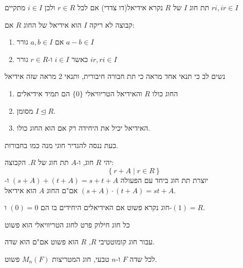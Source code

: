 \documentclass{tstextbook}
\begin{document}
\begin{definition}[אידיאל]
תת חוג \(I\) של \(R\) נקרא אידיאל(דו צדדי) אם לכל \(r\in R\) ולכן \(i \in I\) מתקיים \(ri,ir\in I\)

\end{definition}
\begin{proposition}
קבוצה לא ריקה \(I\) הוא אידיאל של החוג \(R\) אם:

  \begin{enumerate}
    \item אם \(a,b \in I\) גורר \(a-b\in I\)


    \item כאשר \(i \in I\) ו-\(r \in R\) גורר \(ir,ri \in I\)


  \end{enumerate}
\end{proposition}
נשים לב כי תנאי אחד מראה כי תת חבורה חיבורית, ותנאי 2 מראה שזה אידיאל

\begin{remark}
  \begin{enumerate}
    \item החוג כולו \(R\) והאידיאל הטריוויאלי \(\{ 0 \}\) הם תמיד אידיאלים 


    \item מסומן \(I\trianglelefteq R\). 


    \item האידיאל יכיל את היחידה רק אם הוא החוג כולו. 


  \end{enumerate}
\end{remark}
כעת ננסה להגדיר חוגי מנה כמו בחבורות. 

\begin{proposition}
יהי \(R\) חוג, ו-\(A\) תת חוג של \(R\). הקבוצה:
$$\left\{  r+A\mid r\in R  \right\}$$
יוצרת תת חוג ביחד עם הפעולה \((s+A)+(t+A)=s+t+A\) ו-\((s+A)\cdot(t+A)=st+A\) אם"ם החוג \(A\) הוא אידיאל.

\end{proposition}
\begin{definition}
חוג נקרא פשוט אם האידיאלים היחידים בו הם \((0)=0\) ו-\((1)=R\).

\end{definition}
\begin{proposition}
כל חוג חילוק פרט לחוג הטריוויאלי הוא פשוט

\end{proposition}
\begin{proposition}
עבור חוג קומוטטיבי \(R\), \(R\) הוא פשוט אם"ם הוא שדה.

\end{proposition}
\begin{proposition}
לכל שדה \(F\) ו-\(n\) טבעי, חוג המטריצות \(M_{n}(F)\) פשוט.

\end{proposition}
\end{document}
